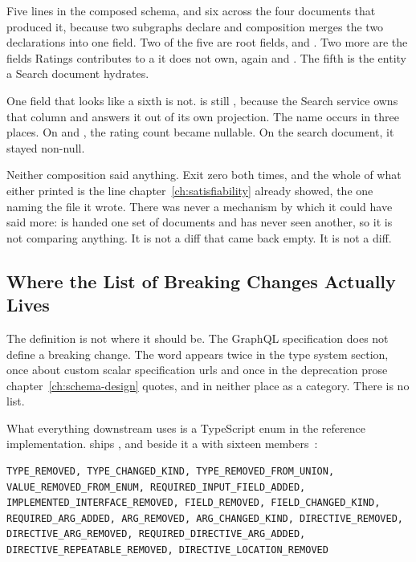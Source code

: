 %
Five lines in the composed schema, and six across the four documents that
produced it, because two subgraphs declare  and composition
merges the two declarations into one field. Two of the five are root fields,  and
. Two more are the fields Ratings contributes to a
 it does not own,  again and
. The fifth is the entity a Search document hydrates.

%
One field that looks like a sixth is not.
 is still , because the
Search service owns that column and answers it out of its own projection.
The name occurs in three places. On  and , the
rating count became nullable. On the search document, it stayed non-null.

%
Neither composition said anything. Exit zero both times, and the whole of what
either printed is the line chapter~\ref{ch:satisfiability} already showed, the
one naming the file it wrote. There was never a mechanism by which it could
have said more:  is handed one set of documents and
has never seen another, so it is not comparing anything. It is not a diff
that came back empty. It is not a diff.

\subsection{Where the List of Breaking Changes Actually Lives}

%
The definition is not where it should be. The GraphQL specification does not
define a breaking change. The word appears twice in the
type system section, once about custom scalar specification urls and once in
the deprecation prose chapter~\ref{ch:schema-design} quotes, and in neither
place as a category. There is no list.

%
What everything downstream uses is a TypeScript enum in the reference
implementation.  ships , and beside
it a  with sixteen members~\autocite{graphqljsbreaking}:

\begin{verbatim}
TYPE_REMOVED, TYPE_CHANGED_KIND, TYPE_REMOVED_FROM_UNION,
VALUE_REMOVED_FROM_ENUM, REQUIRED_INPUT_FIELD_ADDED,
IMPLEMENTED_INTERFACE_REMOVED, FIELD_REMOVED, FIELD_CHANGED_KIND,
REQUIRED_ARG_ADDED, ARG_REMOVED, ARG_CHANGED_KIND, DIRECTIVE_REMOVED,
DIRECTIVE_ARG_REMOVED, REQUIRED_DIRECTIVE_ARG_ADDED,
DIRECTIVE_REPEATABLE_REMOVED, DIRECTIVE_LOCATION_REMOVED
\end{verbatim}


